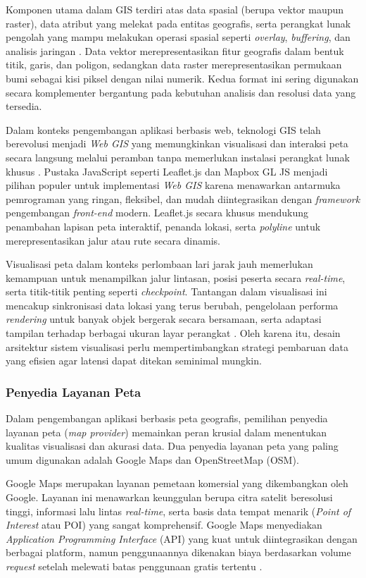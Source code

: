 Komponen utama dalam GIS terdiri atas data spasial (berupa vektor maupun raster), data atribut yang melekat pada entitas geografis, serta perangkat lunak pengolah yang mampu melakukan operasi spasial seperti \textit{overlay}, \textit{buffering}, dan analisis jaringan \cite{burrough2015principles}. Data vektor merepresentasikan fitur geografis dalam bentuk titik, garis, dan poligon, sedangkan data raster merepresentasikan permukaan bumi sebagai kisi piksel dengan nilai numerik. Kedua format ini sering digunakan secara komplementer bergantung pada kebutuhan analisis dan resolusi data yang tersedia.

Dalam konteks pengembangan aplikasi berbasis web, teknologi GIS telah berevolusi menjadi \textit{Web GIS} yang memungkinkan visualisasi dan interaksi peta secara langsung melalui peramban tanpa memerlukan instalasi perangkat lunak khusus \cite{fu2010web}. Pustaka JavaScript seperti Leaflet.js dan Mapbox GL JS menjadi pilihan populer untuk implementasi \textit{Web GIS} karena menawarkan antarmuka pemrograman yang ringan, fleksibel, dan mudah diintegrasikan dengan \textit{framework} pengembangan \textit{front-end} modern. Leaflet.js secara khusus mendukung penambahan lapisan peta interaktif, penanda lokasi, serta \textit{polyline} untuk merepresentasikan jalur atau rute secara dinamis.

Visualisasi peta dalam konteks perlombaan lari jarak jauh memerlukan kemampuan untuk menampilkan jalur lintasan, posisi peserta secara \textit{real-time}, serta titik-titik penting seperti \textit{checkpoint}. Tantangan dalam visualisasi ini mencakup sinkronisasi data lokasi yang terus berubah, pengelolaan performa \textit{rendering} untuk banyak objek bergerak secara bersamaan, serta adaptasi tampilan terhadap berbagai ukuran layar perangkat \cite{maceachren2001research}. Oleh karena itu, desain arsitektur sistem visualisasi perlu mempertimbangkan strategi pembaruan data yang efisien agar latensi dapat ditekan seminimal mungkin.

\subsubsection{Penyedia Layanan Peta}
Dalam pengembangan aplikasi berbasis peta geografis, pemilihan penyedia layanan peta (\textit{map provider}) memainkan peran krusial dalam menentukan kualitas visualisasi dan akurasi data. Dua penyedia layanan peta yang paling umum digunakan adalah Google Maps dan OpenStreetMap (OSM).

Google Maps merupakan layanan pemetaan komersial yang dikembangkan oleh Google. Layanan ini menawarkan keunggulan berupa citra satelit beresolusi tinggi, informasi lalu lintas \textit{real-time}, serta basis data tempat menarik (\textit{Point of Interest} atau POI) yang sangat komprehensif. Google Maps menyediakan \textit{Application Programming Interface} (API) yang kuat untuk diintegrasikan dengan berbagai platform, namun penggunaannya dikenakan biaya berdasarkan volume \textit{request} setelah melewati batas penggunaan gratis tertentu \cite{googlemaps2024}.

